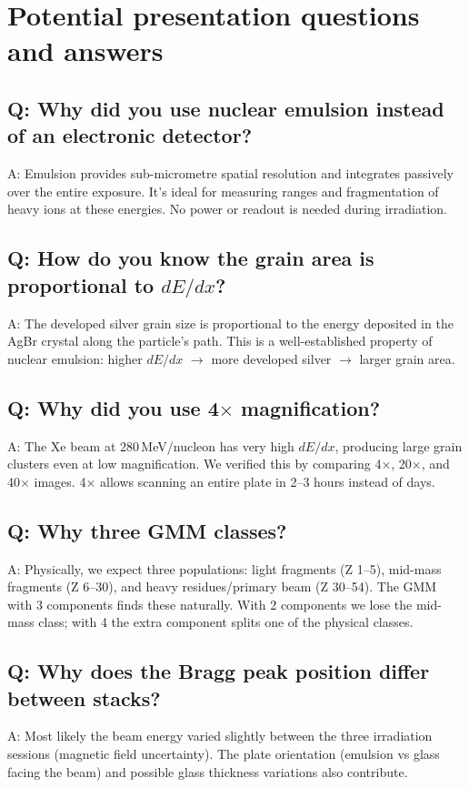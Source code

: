 \documentclass[12pt,a4paper]{article}
\begin{document}
\section{Potential presentation questions and answers}

\subsection*{Q: Why did you use nuclear emulsion instead of an
electronic detector?}
A: Emulsion provides sub-micrometre spatial resolution and integrates
passively over the entire exposure. It's ideal for measuring ranges
and fragmentation of heavy ions at these energies. No power or
readout is needed during irradiation.

\subsection*{Q: How do you know the grain area is proportional to
$dE/dx$?}
A: The developed silver grain size is proportional to the energy
deposited in the AgBr crystal along the particle's path. This is a
well-established property of nuclear emulsion: higher $dE/dx$
$\rightarrow$ more developed silver $\rightarrow$ larger grain area.

\subsection*{Q: Why did you use 4$\times$ magnification?}
A: The Xe beam at 280\,MeV/nucleon has very high $dE/dx$, producing
large grain clusters even at low magnification. We verified this by
comparing 4$\times$, 20$\times$, and 40$\times$ images. 4$\times$
allows scanning an entire plate in 2--3 hours instead of days.

\subsection*{Q: Why three GMM classes?}
A: Physically, we expect three populations: light fragments (Z 1--5),
mid-mass fragments (Z 6--30), and heavy residues/primary beam
(Z 30--54). The GMM with 3 components finds these naturally. With 2
components we lose the mid-mass class; with 4 the extra component
splits one of the physical classes.

\subsection*{Q: Why does the Bragg peak position differ between
stacks?}
A: Most likely the beam energy varied slightly between the three
irradiation sessions (magnetic field uncertainty). The plate
orientation (emulsion vs glass facing the beam) and possible
glass thickness variations also contribute.
\end{document}
